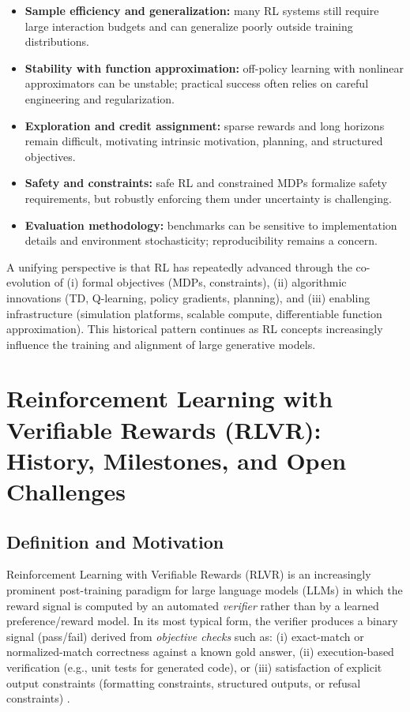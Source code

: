 \documentclass[10pt]{article}
\begin{document}
\begin{itemize}[leftmargin=*]
  \item \textbf{Sample efficiency and generalization:} many RL systems still require large interaction budgets and can generalize poorly outside training distributions.\cite{sutton2018book}
  \item \textbf{Stability with function approximation:} off-policy learning with nonlinear approximators can be unstable; practical success often relies on careful engineering and regularization.\cite{mnih2015dqn}
  \item \textbf{Exploration and credit assignment:} sparse rewards and long horizons remain difficult, motivating intrinsic motivation, planning, and structured objectives.\cite{sutton1990dyna}
  \item \textbf{Safety and constraints:} safe RL and constrained MDPs formalize safety requirements, but robustly enforcing them under uncertainty is challenging.\cite{altman1999cmdp,garcia2015safe}
  \item \textbf{Evaluation methodology:} benchmarks can be sensitive to implementation details and environment stochasticity; reproducibility remains a concern.\cite{henderson2018deep}
\end{itemize}

A unifying perspective is that RL has repeatedly advanced through the co-evolution of (i) formal objectives (MDPs, constraints), (ii) algorithmic innovations (TD, Q-learning, policy gradients, planning), and (iii) enabling infrastructure (simulation platforms, scalable compute, differentiable function approximation).
This historical pattern continues as RL concepts increasingly influence the training and alignment of large generative models.




\section{Reinforcement Learning with Verifiable Rewards (RLVR): History, Milestones, and Open Challenges}
\label{sec:rlvr_history}

\subsection{Definition and Motivation}
Reinforcement Learning with Verifiable Rewards (RLVR) is an increasingly prominent post-training paradigm for large language models (LLMs) in which the reward signal is computed by an automated \emph{verifier} rather than by a learned preference/reward model. In its most typical form, the verifier produces a binary signal (pass/fail) derived from \emph{objective checks} such as: (i) exact-match or normalized-match correctness against a known gold answer, (ii) execution-based verification (e.g., unit tests for generated code), or (iii) satisfaction of explicit output constraints (formatting constraints, structured outputs, or refusal constraints) \cite{lambert2024tulu3,mroueh2025grpo}.
\end{document}
